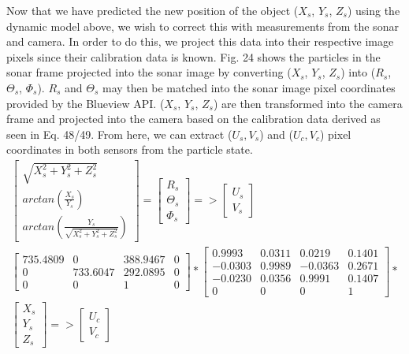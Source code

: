 \documentclass[a4paper]{IEEEtran}
\let\Theta\varTheta
\let\Phi\varPhi
\newcommand{\RSonar}{$\si{\textit{R}_{s}}$\xspace}
\newcommand{\ThetaSonar}{$\si{\Theta_{s}}$\xspace}
\newcommand{\PhiSonar}{$\si{\Phi_{s}}$\xspace}
\newcommand{\XSonar}{$\si{\textit{X}_{s}}$\xspace}
\newcommand{\YSonar}{$\si{\textit{Y}_{s}}$\xspace}
\newcommand{\ZSonar}{$\si{\textit{Z}_{s}}$\xspace}
\begin{document}
Now that we have predicted the new position of the object (\XSonar, \YSonar, \ZSonar) using the dynamic model above, we wish to correct this with measurements from the sonar and camera. In order to do this, we project this data into their respective image pixels since their calibration data is known. Fig. 24 shows the particles in the sonar frame projected into the sonar image by converting (\XSonar, \YSonar, \ZSonar) into (\RSonar, \ThetaSonar, \PhiSonar). \RSonar and \ThetaSonar may then be matched into the sonar image pixel coordinates provided by the Blueview API. (\XSonar, \YSonar, \ZSonar) are then transformed into the camera frame and projected into the camera based on the calibration data derived as seen in Eq. 48/49. From here, we can extract ($U_{s}, V_{s}$) and ($U_{c}, V_{c}$) pixel coordinates in both sensors from the particle state.
\begingroup\makeatletter\def\f@size{7}\check@mathfonts
\begin{gather}
\left[\begin{array}{c}
\sqrt{X_{s}^{2}+Y_{s}^{2}+Z_{s}^{2}}\\
arctan(\frac{X_{s}}{Y_{s}})\\
arctan(\frac{Y_{s}}{\sqrt{X_{s}^{2}+Y_{s}^{2}+Z_{s}^{2}}})
\end{array}\right]=\left[\begin{array}{c}
R_{s}\\
\Theta_{s}\\
\Phi_{s}
\end{array}\right]=>\left[\begin{array}{c}
U_{s}\\
V_{s}
\end{array}\right] \\
\left[\begin{array}{cccc}
735.4809 & 0 & 388.9467 & 0\\
0 & 733.6047 & 292.0895 & 0\\
0 & 0 & 1 & 0
\end{array}\right]*\left[\begin{array}{cccc}
0.9993 & 0.0311 & 0.0219 & 0.1401\\
-0.0303 & 0.9989 & -0.0363 & 0.2671\\
-0.0230 & 0.0356 & 0.9991 & 0.1407\\
0 & 0 & 0 & 1
\end{array}\right]* \nonumber\\
\left[\begin{array}{c}
X_{s}\\
Y_{s}\\
Z_{s}
\end{array}\right]=>\left[\begin{array}{c}
U_{c}\\
V_{c}
\end{array}\right]
\end{gather}
\endgroup 
\end{document}
